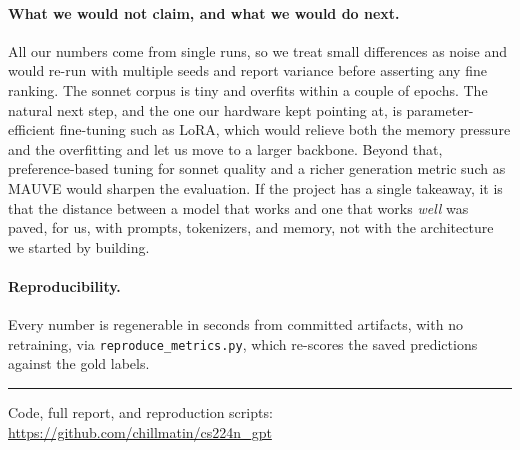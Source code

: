 \documentclass[11pt]{article}
\begin{document}
\paragraph{What we would not claim, and what we would do next.} All our numbers
come from single runs, so we treat small differences as noise and would re-run
with multiple seeds and report variance before asserting any fine ranking. The
sonnet corpus is tiny and overfits within a couple of epochs. The natural next
step, and the one our hardware kept pointing at, is parameter-efficient
fine-tuning such as LoRA, which would relieve both the memory pressure and the
overfitting and let us move to a larger backbone. Beyond that, preference-based
tuning for sonnet quality and a richer generation metric such as MAUVE would
sharpen the evaluation. If the project has a single takeaway, it is that the
distance between a model that works and one that works \emph{well} was paved, for
us, with prompts, tokenizers, and memory, not with the architecture we started by
building.

\paragraph{Reproducibility.} Every number is regenerable in seconds from
committed artifacts, with no retraining, via \texttt{reproduce\_metrics.py}, which
re-scores the saved predictions against the gold labels.

\vspace{0.8em}
\hrule
\vspace{0.6em}
{\small Code, full report, and reproduction scripts:
\url{https://github.com/chillmatin/cs224n_gpt}}
\end{document}
